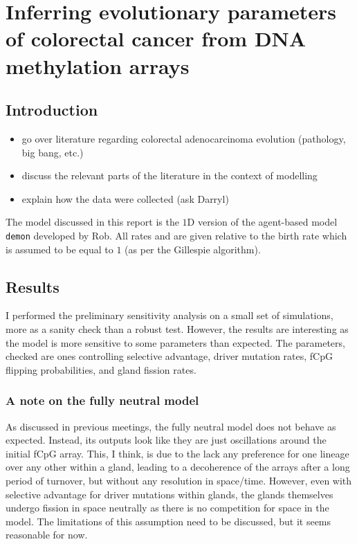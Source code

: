 \chapter{Inferring evolutionary parameters of colorectal cancer from DNA methylation arrays}\label{chapter:methylation}
\section{Introduction}
\begin{itemize}
    \item go over literature regarding colorectal adenocarcinoma evolution (pathology, big bang, etc.)
    \item discuss the relevant parts of the literature in the context of modelling
    \item explain how the data were collected (ask Darryl)
\end{itemize}
The model discussed in this report is the $1$D version of the agent-based model \texttt{demon} developed by Rob. All rates and are given relative to the birth rate which is assumed to be equal to $1$ (as per the Gillespie algorithm).
\section{Results}
I performed the preliminary sensitivity analysis on a small set of simulations, more as a sanity check than a robust test. However, the results are interesting as the model is more sensitive to some parameters than expected. The parameters, checked are ones controlling selective advantage, driver mutation rates, fCpG flipping probabilities, and gland fission rates.
\subsection{A note on the fully neutral model}
As discussed in previous meetings, the fully neutral model does not behave as expected. Instead, its outputs look like they are just oscillations around the initial fCpG array. This, I think, is due to the lack any preference for one lineage over any other within a gland, leading to a decoherence of the arrays after a long period of turnover, but without any resolution in space/time. However, even with selective advantage for driver mutations within glands, the glands themselves undergo fission in space neutrally as there is no competition for space in the model. The limitations of this assumption need to be discussed, but it seems reasonable for now.

